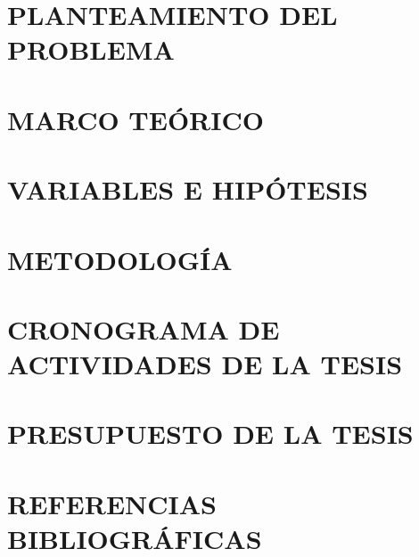 
\tableofcontents
\listoftables
\listoffigures
\chapter{PLANTEAMIENTO DEL PROBLEMA}

\chapter{MARCO TEÓRICO}

\chapter{VARIABLES E HIPÓTESIS}

\chapter{METODOLOGÍA}

\chapter{CRONOGRAMA DE ACTIVIDADES DE LA TESIS}


\chapter{PRESUPUESTO DE LA TESIS}


\chapter{REFERENCIAS BIBLIOGRÁFICAS}
\printbibliography[heading=none]

\clearpage
{}


